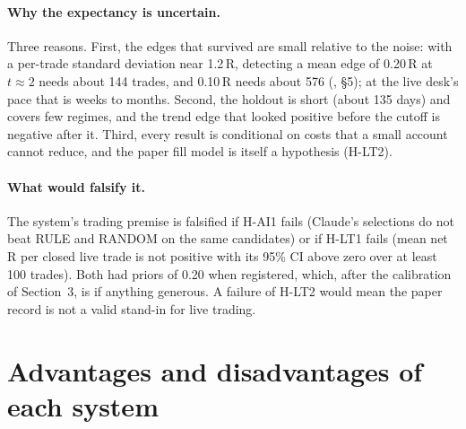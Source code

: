 \documentclass[10pt,a4paper]{article}
\newcommand{\hyp}[1]{\textsf{#1}}
\begin{document}
\paragraph{Why the expectancy is uncertain.} Three reasons. First, the edges that survived are small relative to the noise: with a per-trade standard deviation near 1.2\,R, detecting a mean edge of 0.20\,R at $t\approx 2$ needs about 144 trades, and 0.10\,R needs about 576 (\protect{}, \S5); at the live desk's pace that is weeks to months. Second, the holdout is short (about 135 days) and covers few regimes, and the trend edge that looked positive before the cutoff is negative after it. Third, every result is conditional on costs that a small account cannot reduce, and the paper fill model is itself a hypothesis (\hyp{H-LT2}).

\paragraph{What would falsify it.} The system's trading premise is falsified if \hyp{H-AI1} fails (Claude's selections do not beat RULE and RANDOM on the same candidates) or if \hyp{H-LT1} fails (mean net R per closed live trade is not positive with its 95\% CI above zero over at least 100 trades). Both had priors of 0.20 when registered, which, after the calibration of Section~3, is if anything generous. A failure of \hyp{H-LT2} would mean the paper record is not a valid stand-in for live trading.

\section{Advantages and disadvantages of each system}
\end{document}
